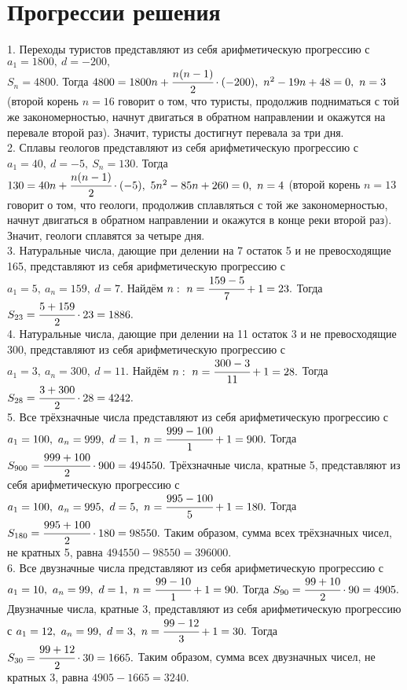 \section{Прогрессии решения}
1. Переходы туристов представляют из себя арифметическую прогрессию с $a_1=1800,\ d=-200,$\\$S_n=4800.$ Тогда $4800=1800n+\cfrac{n(n-1)}{2}\cdot(-200),\
n^2-19n+48=0,\ n=3$ (второй корень $n=16$ говорит о том, что туристы, продолжив подниматься с той же закономерностью, начнут двигаться в обратном направлении и окажутся на перевале второй раз). Значит, туристы достигнут перевала за три дня.\\
2. Сплавы геологов представляют из себя арифметическую прогрессию с $a_1=40,\ d=-5,\ S_n=130.$ Тогда $130=40n+\cfrac{n(n-1)}{2}\cdot(-5),\
5n^2-85n+260=0,\ n=4$ (второй корень $n=13$ говорит о том, что геологи, продолжив сплавляться с той же закономерностью, начнут двигаться в обратном направлении и окажутся в конце реки второй раз). Значит, геологи сплавятся за четыре дня.\\
3. Натуральные числа, дающие при делении на 7 остаток 5 и не превосходящие 165, представляют из себя арифметическую прогрессию с $a_1=5,\ a_n=159,\ d=7.$ Найдём $n:\ n=\cfrac{159-5}{7}+1=23.$ Тогда $S_{23}=\cfrac{5+159}{2}\cdot23=1886.$\\
4. Натуральные числа, дающие при делении на 11 остаток 3 и не превосходящие 300, представляют из себя арифметическую прогрессию с $a_1=3,\ a_n=300,\ d=11.$ Найдём $n:\ n=\cfrac{300-3}{11}+1=28.$ Тогда $S_{28}=\cfrac{3+300}{2}\cdot28=4242.$\\
5. Все трёхзначные числа представляют из себя арифметическую прогрессию с $a_1=100,\ a_n=999,\ d=1,\ n=\cfrac{999-100}{1}+1=900.$ Тогда $S_{900}=\cfrac{999+100}{2}\cdot900=494550.$ Трёхзначные числа, кратные 5, представляют из себя арифметическую прогрессию с $a_1=100,\ a_n=995,\ d=5,\ n=\cfrac{995-100}{5}+1=180.$ Тогда $S_{180}=\cfrac{995+100}{2}\cdot180=98550.$ Таким образом, сумма всех трёхзначных чисел, не кратных 5, равна $494550-98550=396000.$\\
6. Все двузначные числа представляют из себя арифметическую прогрессию с $a_1=10,\ a_n=99,\ d=1,\ n=\cfrac{99-10}{1}+1=90.$ Тогда $S_{90}=\cfrac{99+10}{2}\cdot90=4905.$ Двузначные числа, кратные 3, представляют из себя арифметическую прогрессию с $a_1=12,\ a_n=99,\ d=3,\ n=\cfrac{99-12}{3}+1=30.$ Тогда $S_{30}=\cfrac{99+12}{2}\cdot30=1665.$ Таким образом, сумма всех двузначных чисел, не кратных 3, равна $4905-1665=3240.$\\
